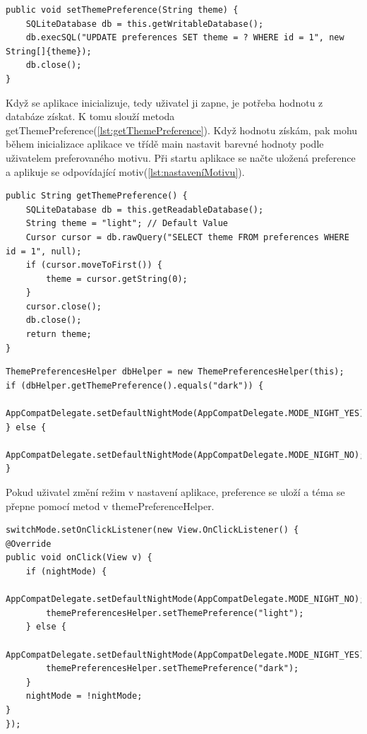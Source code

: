 \begin{lstlisting}[style=javastyle,caption = {setThemePreference},label = {lst:setThemePreference}]
public void setThemePreference(String theme) {
    SQLiteDatabase db = this.getWritableDatabase();
    db.execSQL("UPDATE preferences SET theme = ? WHERE id = 1", new String[]{theme});
    db.close();
}
\end{lstlisting}

Když se aplikace inicializuje, tedy uživatel ji zapne, je potřeba hodnotu z databáze získat. K tomu slouží metoda getThemePreference(\autoref{lst:getThemePreference}). Když hodnotu získám, pak mohu během inicializace aplikace ve třídě main nastavit barevné hodnoty podle uživatelem preferovaného motivu. Při startu aplikace se načte uložená preference a aplikuje se odpovídající motiv(\autoref{lst:nastaveníMotivu}).

\begin{lstlisting}[style=javastyle,caption = {getThemePreference},label = {lst:getThemePreference}]
public String getThemePreference() {
    SQLiteDatabase db = this.getReadableDatabase();
    String theme = "light"; // Default Value
    Cursor cursor = db.rawQuery("SELECT theme FROM preferences WHERE id = 1", null);
    if (cursor.moveToFirst()) {
        theme = cursor.getString(0);
    }
    cursor.close();
    db.close();
    return theme;
}
\end{lstlisting}
\begin{lstlisting}[style=javastyle,caption = {Nastavení motivu},label = {lst:nastaveníMotivu}]
ThemePreferencesHelper dbHelper = new ThemePreferencesHelper(this);
if (dbHelper.getThemePreference().equals("dark")) {
    AppCompatDelegate.setDefaultNightMode(AppCompatDelegate.MODE_NIGHT_YES);
} else {
    AppCompatDelegate.setDefaultNightMode(AppCompatDelegate.MODE_NIGHT_NO);
}
\end{lstlisting}

Pokud uživatel změní režim v nastavení aplikace, preference se uloží a téma se přepne pomocí metod v themePreferenceHelper.
\begin{lstlisting}[style=javastyle,caption = {Změnění motivu},label = {lst:nastaveníMotivu}]
switchMode.setOnClickListener(new View.OnClickListener() {
@Override
public void onClick(View v) {
    if (nightMode) {
        AppCompatDelegate.setDefaultNightMode(AppCompatDelegate.MODE_NIGHT_NO);
        themePreferencesHelper.setThemePreference("light");
    } else {
        AppCompatDelegate.setDefaultNightMode(AppCompatDelegate.MODE_NIGHT_YES);
        themePreferencesHelper.setThemePreference("dark");
    }
    nightMode = !nightMode;
}
});
\end{lstlisting}

